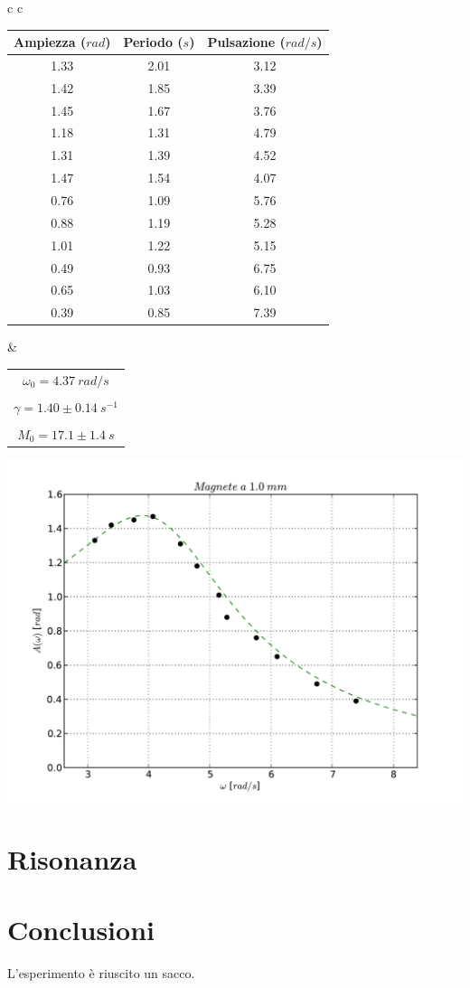 \begin{center}

\begin{tabular}{c c}

\begin{tabular}{c | c | c}

\textbf{Ampiezza} ($rad$) & \textbf{Periodo} ($s$) & \textbf{Pulsazione} ($rad/s$)\\
\midrule
1.33 & 2.01 & 3.12\\
1.42 & 1.85 & 3.39\\
1.45 & 1.67 & 3.76\\
1.18 & 1.31 & 4.79\\
1.31 & 1.39 & 4.52\\
1.47 & 1.54 & 4.07\\
0.76 & 1.09 & 5.76\\
0.88 & 1.19 & 5.28\\
1.01 & 1.22 & 5.15\\
0.49 & 0.93 & 6.75\\
0.65 & 1.03 & 6.10\\
0.39 & 0.85 & 7.39\\

\end{tabular}

& \hspace{1cm}

\begin{tabular}{c}
$\omega_0 = 4.37\ rad/s $\\
\\
$\gamma = 1.40 \pm 0.14\ s^{-1}$\\
\\
$M_0 = 17.1 \pm 1.4\ s$\\
\end{tabular}

\end{tabular}

\end{center}

\includegraphics[scale=0.75]{"../grafici/Magnetea10mm"}

\section{Risonanza}
\section{Conclusioni}
L'esperimento è riuscito un sacco.

